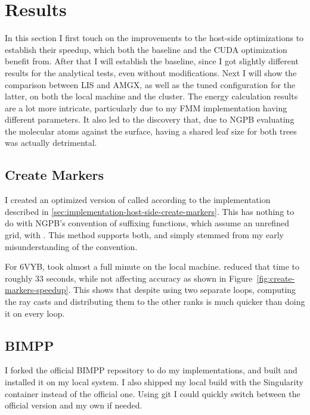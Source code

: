 \section{Results}
\label{sec:evaluation-results}

In this section I first touch on the improvements to the host-side optimizations to establish their speedup, which both the baseline and the CUDA optimization benefit from.
After that I will establish the baseline, since I got slightly different results for the analytical tests, even without modifications.
Next I will show the comparison between LIS and AMGX, as well as the tuned configuration for the latter, on both the local machine and the cluster.
The energy calculation results are a lot more intricate, particularly due to my FMM implementation having different parameters.
It also led to the discovery that, due to NGPB evaluating the molecular atoms against the surface, having a shared leaf size for both trees was actually detrimental.

\subsection{Create Markers}
\label{sec:evaluation-results-create-markers}

I created an optimized version of  called  according to the implementation described in \ref{sec:implementation-host-side-create-markers}.
This has nothing to do with NGPB's convention of suffixing functions, which assume an unrefined grid, with .
This method supports both, and simply stemmed from my early misunderstanding of the convention.

For 6VYB,  took almost a full minute on the local machine.
 reduced that time to roughly 33 seconds, while not affecting accuracy as shown in Figure~\ref{fig:create-markers-speedup}.
This shows that despite using two separate loops, computing the ray casts and distributing them to the other ranks is much quicker than doing it on every loop.


\FloatBarrier

\subsection{BIMPP}
\label{sec:evaluation-results-bimpp}

I forked the official BIMPP repository to do my implementations, and built and installed it on my local system.
I also shipped my local build with the Singularity container instead of the official one.
Using git I could quickly switch between the official version and my own if needed.


